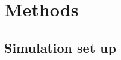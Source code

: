 \documentclass[journal=jpcbfk,manuscript=article]{achemso}
\begin{document}




\section{\label{sec:methods}Methods}

\subsection{\label{sec:methods}Simulation set up}
\end{document}
